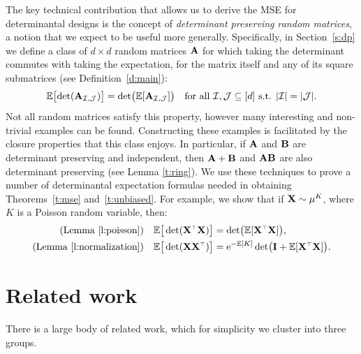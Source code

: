 \documentclass[11pt]{article}
\begin{document}
The key technical contribution that allows us to derive the MSE for determinantal designs is the concept of \emph{determinant preserving random matrices}, a notion that we expect to be useful more generally.
Specifically, in Section~\ref{s:dp} we define a class of $d\times d$ random
matrices $\mathbf A$ for which taking the determinant commutes with taking
the expectation, for the matrix itself and any of its square submatrices (see Definition~\ref{d:main}):
\begin{align*}
  \mathbb E\big[\!\det(\mathbf A_{\mathcal I,\mathcal{J}})\big] =
  \det\!\big(\mathbb E[\mathbf A_{\mathcal I,\mathcal{J}}]\big)\quad \text{for all }\mathcal I,\mathcal{J}\subseteq
  [d]\text{ s.t. }|\mathcal I|=|\mathcal{J}|.
\end{align*}
  Not all random matrices satisfy this property, however many
interesting and non-trivial examples can be found. Constructing
these examples is facilitated by the closure properties that this
class enjoys. In particular, if $\mathbf A$ and $\mathbf B$ are determinant
preserving and independent, then $\mathbf A+\mathbf B$ and $\mathbf A\mathbf B$ are also
determinant preserving (see Lemma \ref{t:ring}). We use these
techniques to prove a number of determinantal expectation
formulas needed in obtaining Theorems~\ref{t:mse}
and~\ref{t:unbiased}. For example, we show that if $\mathbf X\sim\mu^K$,
where $K$ is a Poisson random variable, then:
\begin{align*}
  \text{(Lemma \ref{l:poisson})}\quad  \E\big[\det(\X^\top\X)\big]
  &= \det\!\big(\E[\X^\top\X]\big),\\
\text{(Lemma \ref{l:normalization})}\quad  \E\big[\det(\X\X^\top)\big]
&= \ee^{-\E[K]}\det\!\big(\I + \E[\X^\top\X]\big).
\end{align*}

\section{Related work}
\label{s:related-work}

There is a large body of related work, which for simplicity we cluster into three groups.
\end{document}
